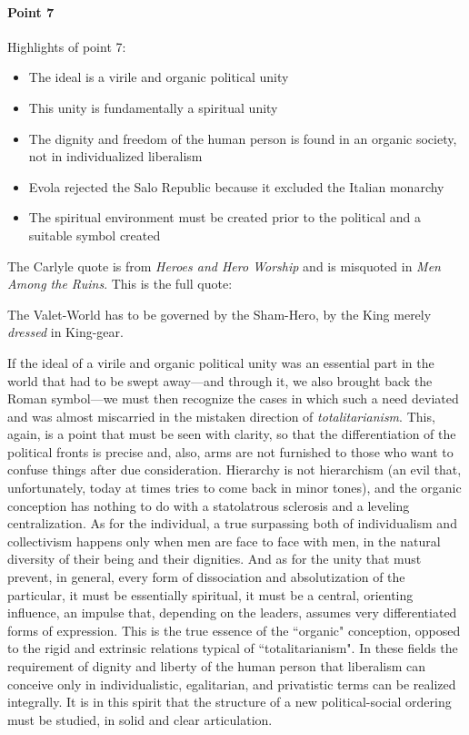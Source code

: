 \paragraph{Point 7}
\begin{quotex}
Highlights of point 7:

\begin{itemize}
\item
The ideal is a virile and organic political unity 

\item
This unity is fundamentally a spiritual unity 

\item
The dignity and freedom of the human person is found in an organic society, not in individualized liberalism 

\item
Evola rejected the Salo Republic because it excluded the Italian monarchy 

\item
The spiritual environment must be created prior to the political and a suitable symbol created 

\end{itemize}

The Carlyle quote is from \textit{Heroes and Hero Worship} and is misquoted in \textit{Men Among the Ruins}. This is the full quote:

The Valet-World has to be governed by the Sham-Hero, by the King merely \emph{dressed} in King-gear. 

\end{quotex}
If the ideal of a virile and organic political unity was an essential part in the world that had to be swept away—and through it, we also brought back the Roman symbol—we must then recognize the cases in which such a need deviated and was almost miscarried in the mistaken direction of \emph{totalitarianism}. This, again, is a point that must be seen with clarity, so that the differentiation of the political fronts is precise and, also, arms are not furnished to those who want to confuse things after due consideration. Hierarchy is not hierarchism (an evil that, unfortunately, today at times tries to come back in minor tones), and the organic conception has nothing to do with a statolatrous sclerosis and a leveling centralization. As for the individual, a true surpassing both of individualism and collectivism happens only when men are face to face with men, in the natural diversity of their being and their dignities. And as for the unity that must prevent, in general, every form of dissociation and absolutization of the particular, it must be essentially spiritual, it must be a central, orienting influence, an impulse that, depending on the leaders, assumes very differentiated forms of expression. This is the true essence of the ``organic" conception, opposed to the rigid and extrinsic relations typical of ``totalitarianism". In these fields the requirement of dignity and liberty of the human person that liberalism can conceive only in individualistic, egalitarian, and privatistic terms can be realized integrally. It is in this spirit that the structure of a new political-social ordering must be studied, in solid and clear articulation.

